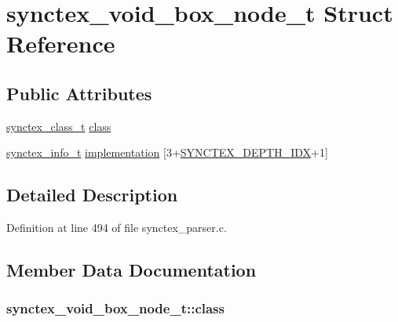 \hypertarget{structsynctex__void__box__node__t}{\section{synctex\+\_\+void\+\_\+box\+\_\+node\+\_\+t Struct Reference}
\label{structsynctex__void__box__node__t}
}
\subsection*{Public Attributes}
\begin{DoxyCompactItemize}
\item 
\hyperlink{synctex__parser_8c_a68d11a2cb22716e7abd35cffed7d54c5}{synctex\+\_\+class\+\_\+t} \hyperlink{structsynctex__void__box__node__t_a4b2ae93cb2c002b75c55aea82daa3b02}{class}
\item 
\hyperlink{synctex__parser_8c_a864f981cdab43a24765efb685074cf70}{synctex\+\_\+info\+\_\+t} \hyperlink{structsynctex__void__box__node__t_a101b3430abcfd244d1dbbea260bd2bb2}{implementation} \mbox{[}3+\hyperlink{synctex__parser_8c_a0e26cbae47f43d1a9bfe1de9f67b9c05}{S\+Y\+N\+C\+T\+E\+X\+\_\+\+D\+E\+P\+T\+H\+\_\+\+I\+D\+X}+1\mbox{]}
\end{DoxyCompactItemize}


\subsection{Detailed Description}


Definition at line 494 of file synctex\+\_\+parser.\+c.



\subsection{Member Data Documentation}
\hypertarget{structsynctex__void__box__node__t_a4b2ae93cb2c002b75c55aea82daa3b02}{
\subsubsection[{class}]{ synctex\+\_\+void\+\_\+box\+\_\+node\+\_\+t\+::class}}\label{structsynctex__void__box__node__t_a4b2ae93cb2c002b75c55aea82daa3b02}


